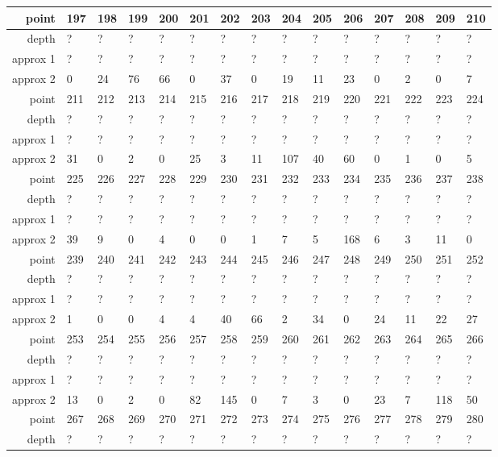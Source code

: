 \begin{center}
\begin{supertabular}{|r|l l l l l l l l l l l l l l|}
\hline
point & 197 & 198 & 199 & 200 & 201 & 202 & 203 & 204 & 205 & 206 & 207 & 208 & 209 & 210 \\
\hline
depth & ? & ? & ? & ? & ? & ? & ? & ? & ? & ? & ? & ? & ? & ? \\
approx 1 & ? & ? & ? & ? & ? & ? & ? & ? & ? & ? & ? & ? & ? & ? \\
approx 2 & 0 & 24 & 76 & 66 & 0 & 37 & 0 & 19 & 11 & 23 & 0 & 2 & 0 & 7 \\
\hline
point & 211 & 212 & 213 & 214 & 215 & 216 & 217 & 218 & 219 & 220 & 221 & 222 & 223 & 224 \\
\hline
depth & ? & ? & ? & ? & ? & ? & ? & ? & ? & ? & ? & ? & ? & ? \\
approx 1 & ? & ? & ? & ? & ? & ? & ? & ? & ? & ? & ? & ? & ? & ? \\
approx 2 & 31 & 0 & 2 & 0 & 25 & 3 & 11 & 107 & 40 & 60 & 0 & 1 & 0 & 5 \\
\hline
point & 225 & 226 & 227 & 228 & 229 & 230 & 231 & 232 & 233 & 234 & 235 & 236 & 237 & 238 \\
\hline
depth & ? & ? & ? & ? & ? & ? & ? & ? & ? & ? & ? & ? & ? & ? \\
approx 1 & ? & ? & ? & ? & ? & ? & ? & ? & ? & ? & ? & ? & ? & ? \\
approx 2 & 39 & 9 & 0 & 4 & 0 & 0 & 1 & 7 & 5 & 168 & 6 & 3 & 11 & 0 \\
\hline
point & 239 & 240 & 241 & 242 & 243 & 244 & 245 & 246 & 247 & 248 & 249 & 250 & 251 & 252 \\
\hline
depth & ? & ? & ? & ? & ? & ? & ? & ? & ? & ? & ? & ? & ? & ? \\
approx 1 & ? & ? & ? & ? & ? & ? & ? & ? & ? & ? & ? & ? & ? & ? \\
approx 2 & 1 & 0 & 0 & 4 & 4 & 40 & 66 & 2 & 34 & 0 & 24 & 11 & 22 & 27 \\
\hline
point & 253 & 254 & 255 & 256 & 257 & 258 & 259 & 260 & 261 & 262 & 263 & 264 & 265 & 266 \\
\hline
depth & ? & ? & ? & ? & ? & ? & ? & ? & ? & ? & ? & ? & ? & ? \\
approx 1 & ? & ? & ? & ? & ? & ? & ? & ? & ? & ? & ? & ? & ? & ? \\
approx 2 & 13 & 0 & 2 & 0 & 82 & 145 & 0 & 7 & 3 & 0 & 23 & 7 & 118 & 50 \\
\hline
point & 267 & 268 & 269 & 270 & 271 & 272 & 273 & 274 & 275 & 276 & 277 & 278 & 279 & 280 \\
\hline
depth & ? & ? & ? & ? & ? & ? & ? & ? & ? & ? & ? & ? & ? & ? \\

\end{supertabular}
\end{center}
